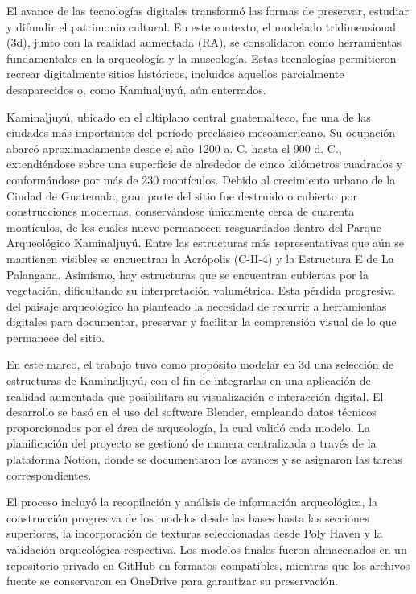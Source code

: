 
El avance de las tecnologías digitales transformó las formas de preservar, estudiar y difundir el patrimonio cultural. En este contexto, el modelado tridimensional (\gls{3d}), junto con la realidad aumentada (\gls{RA}), se consolidaron como herramientas fundamentales en la arqueología y la museología. Estas tecnologías permitieron recrear digitalmente sitios históricos, incluidos aquellos parcialmente desaparecidos o, como Kaminaljuyú, aún enterrados.

Kaminaljuyú, ubicado en el altiplano central guatemalteco, fue una de las ciudades más importantes del período preclásico mesoamericano. Su ocupación abarcó aproximadamente desde el año 1200 a. C. hasta el 900 d. C., extendiéndose sobre una superficie de alrededor de cinco kilómetros cuadrados y conformándose por más de 230 montículos. Debido al crecimiento urbano de la Ciudad de Guatemala, gran parte del sitio fue destruido o cubierto por construcciones modernas, conservándose únicamente cerca de cuarenta montículos, de los cuales nueve permanecen resguardados dentro del Parque Arqueológico Kaminaljuyú. Entre las estructuras más representativas que aún se mantienen visibles se encuentran la Acrópolis (C-II-4) y la Estructura E de La Palangana. Asimismo, hay estructuras que se encuentran cubiertas por la vegetación, dificultando su interpretación volumétrica. Esta pérdida progresiva del paisaje arqueológico ha planteado la necesidad de recurrir a herramientas digitales para documentar, preservar y facilitar la comprensión visual de lo que permanece del sitio.

En este marco, el trabajo tuvo como propósito modelar en \gls{3d} una selección de estructuras de Kaminaljuyú, con el fin de integrarlas en una aplicación de realidad aumentada que posibilitara su visualización e interacción digital. El desarrollo se basó en el uso del software Blender, empleando datos técnicos proporcionados por el área de arqueología, la cual validó cada modelo. La planificación del proyecto se gestionó de manera centralizada a través de la plataforma Notion, donde se documentaron los avances y se asignaron las tareas correspondientes.

El proceso incluyó la recopilación y análisis de información arqueológica, la construcción progresiva de los modelos desde las bases hasta las secciones superiores, la incorporación de texturas seleccionadas desde Poly Haven y la validación arqueológica respectiva. Los modelos finales fueron almacenados en un repositorio privado en GitHub en formatos compatibles, mientras que los archivos fuente se conservaron en OneDrive para garantizar su preservación.

